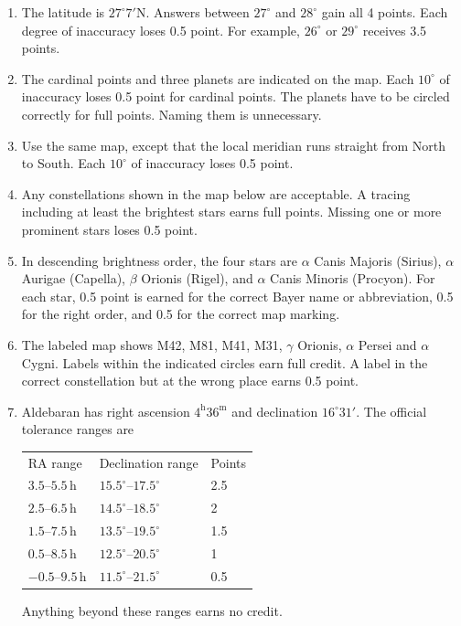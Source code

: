 \begin{enumerate}
\item The latitude is $27^\circ7'\mathrm N$. Answers between $27^\circ$ and $28^\circ$ gain all 4 points. Each degree of inaccuracy loses 0.5 point. For example, $26^\circ$ or $29^\circ$ receives 3.5 points.
\item The cardinal points and three planets are indicated on the map. Each $10^\circ$ of inaccuracy loses 0.5 point for cardinal points. The planets have to be circled correctly for full points. Naming them is unnecessary.
\item Use the same map, except that the local meridian runs straight from North to South. Each $10^\circ$ of inaccuracy loses 0.5 point.
\item Any constellations shown in the map below are acceptable. A tracing including at least the brightest stars earns full points. Missing one or more prominent stars loses 0.5 point.
\item In descending brightness order, the four stars are $\alpha$ Canis Majoris (Sirius), $\alpha$ Aurigae (Capella), $\beta$ Orionis (Rigel), and $\alpha$ Canis Minoris (Procyon).
For each star, 0.5 point is earned for the correct Bayer name or abbreviation, 0.5 for the right order, and 0.5 for the correct map marking.
\item The labeled map shows M42, M81, M41, M31, $\gamma$ Orionis, $\alpha$ Persei and $\alpha$ Cygni. Labels within the indicated circles earn full credit. A label in the correct constellation but at the wrong place earns 0.5 point.
\item Aldebaran has right ascension $4^{\mathrm h}36^{\mathrm m}$ and declination $16^\circ31'$.
The official tolerance ranges are
\begin{center}\begin{tabular}{lll}
RA range & Declination range & Points\\
$3.5$--$5.5\,\mathrm h$ & $15.5^\circ$--$17.5^\circ$ & 2.5\\
$2.5$--$6.5\,\mathrm h$ & $14.5^\circ$--$18.5^\circ$ & 2\\
$1.5$--$7.5\,\mathrm h$ & $13.5^\circ$--$19.5^\circ$ & 1.5\\
$0.5$--$8.5\,\mathrm h$ & $12.5^\circ$--$20.5^\circ$ & 1\\
$-0.5$--$9.5\,\mathrm h$ & $11.5^\circ$--$21.5^\circ$ & 0.5
\end{tabular}\end{center}
Anything beyond these ranges earns no credit.
\end{enumerate}
